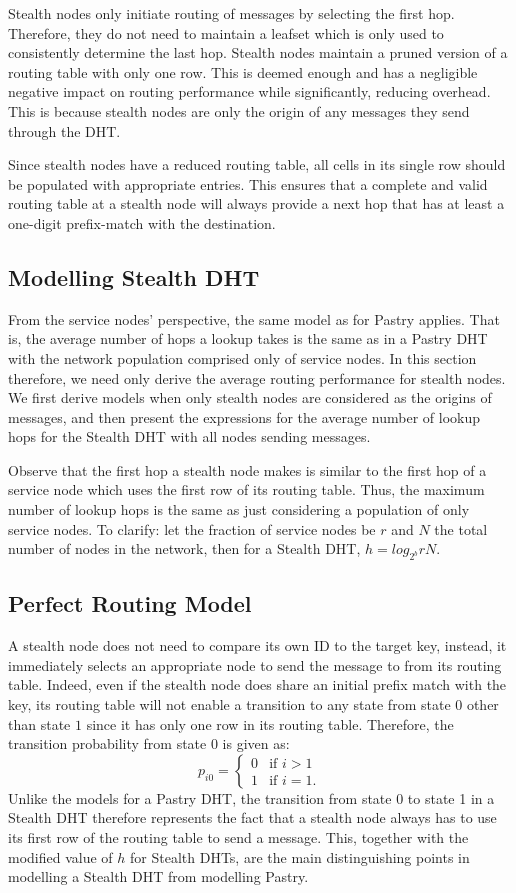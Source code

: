 \documentclass[10pt,twocolumn]{article}
\begin{document}
Stealth nodes only initiate routing of messages by selecting the first hop.
Therefore, they do not need to maintain a leafset which is only used to
consistently determine the last hop. Stealth nodes maintain a pruned version of
a routing table with only one row. This is deemed enough and has a negligible
negative impact on routing performance while significantly, reducing overhead.
This is because stealth nodes are only the origin of any messages they send
through the DHT.

Since stealth nodes have a reduced routing table, all cells in its single row
should be populated with appropriate entries. This ensures that a complete and
valid routing table at a stealth node will always provide a next hop that has
at least a one-digit prefix-match with the destination.

\subsection{Modelling Stealth DHT}
From the service nodes' perspective, the same model as for Pastry applies. That
is, the average number of hops a lookup takes is the same as in a Pastry DHT
with the network population comprised only of service nodes. In this section
therefore, we need only derive the average routing performance for stealth
nodes. We first derive models when only stealth nodes are considered as the
origins of messages, and then present the expressions for the average number of
lookup hops for the Stealth DHT with all nodes sending messages.

Observe that the first hop a stealth node makes is similar to the first hop of
a service node which uses the first row of its routing table. Thus, the maximum
number of lookup hops is the same as just considering a population of only
service nodes. To clarify: let the fraction of service nodes be $r$ and $N$ the
total number of nodes in the network, then for a Stealth DHT, $h = log_{2^b}
rN$.

\subsection{Perfect Routing Model}
A stealth node does not need to compare its own ID to the target key, instead,
it immediately selects an appropriate node to send the message to from its
routing table. Indeed, even if the stealth node does share an initial prefix
match with the key, its routing table will not enable a transition to any state
from state $0$ other than state $1$ since it has only one row in its routing
table. Therefore, the transition probability from state $0$ is given as:
\[p_{i0} = \left\{ \begin{array}{ll}
         0 & \mbox{if $i > 1$}\\
         1 & \mbox{if $i = 1$}
         .\end{array} \right. \]
Unlike the models for a Pastry DHT, the transition from state 0 to state 1 in a
Stealth DHT therefore represents the fact that a stealth node always has to use
its first row of the routing table to send a message. This, together with the
modified value of $h$  for Stealth DHTs, are the main distinguishing points in
modelling a Stealth DHT from modelling Pastry.
\end{document}
